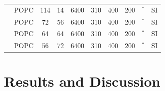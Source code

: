 \documentclass[pre,aps,floatfix,authordate1-4,twocolumn]{revtex4-1}
\begin{document}
\begin{table}[htb]
\begin{tabular}{c c c c c c c c c c}
                          & POPC   & 114  & 14 & 6400  & 310  & 400 & 200 & \cite{macrogCHOLfiles}$^*$ & SI    \\
                          & POPC   & 72   & 56 & 6400  & 310  & 400 & 200 & \cite{macrogCHOLfiles}$^*$ & SI    \\
                             & POPC   & 64  & 64 & 6400  & 310  & 400 & 200 & \cite{macrogCHOLfiles}$^*$ & SI    \\
                             & POPC   & 56   & 72 & 6400  & 310  & 400 & 200 & \cite{macrogCHOLfiles}$^*$ & SI    \\
\end{tabular}
\end{table} 


 





\section{Results and Discussion}
\end{document}
